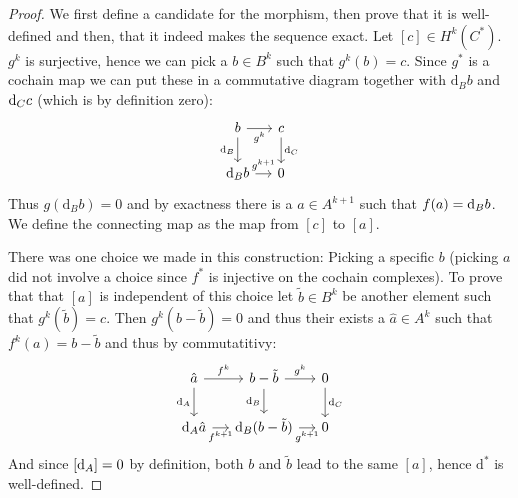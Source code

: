 \begin{proof}
We first define a candidate for the morphism, then prove that it is well-defined and then,
that it indeed makes the sequence exact. Let $[c] \in H^k(C^*)$. $g^k$ is surjective, hence
we can pick a $b \in B^k$ such that $g^k(b) = c$. Since $g^*$ is a cochain map we can put
these in a commutative diagram together with $\mathrm{d}_B b$ and $\mathrm{d}_C c$ (which is by
definition zero):
\[\begin{tikzcd}[column sep=small]
	b & c \\
	{\mathrm{d}_B b} & 0
	\arrow["{g^k}"', from=1-1, to=1-2]
	\arrow["{\mathrm{d}_B}"', from=1-1, to=2-1]
	\arrow["{\mathrm{d}_C}", from=1-2, to=2-2]
	\arrow["{g^{k + 1}}", from=2-1, to=2-2]
\end{tikzcd}\]
Thus $g(\mathrm{d}_B b) = 0$ and by exactness there is a $a \in A^{k + 1}$ such that 
$f(a) = \mathrm{d}_B b$. We define the connecting map as the map from $[c]$ to $[a]$.

There was one choice we made in this construction: Picking a specific $b$ (picking $a$ did not
involve a choice since $f^*$ is injective on the cochain complexes). To prove that that $[a]$
is independent of this choice let $\tilde{b} \in B^k$ be another element such that
$g^k(\tilde{b})=c$. Then $g^k(b - \tilde{b}) = 0$ and thus their exists a $\hat{a} \in A^k$
such that $f^k(a) = b - \tilde{b}$ and thus by commutatitivy:
\[\begin{tikzcd}[column sep=small]
	{\hat{a}} & {b - \tilde{b}} & 0 \\
	{\mathrm{d}_A\hat{a}} & {\mathrm{d}_B(b - \tilde{b})} & 0
	\arrow["{f^k}", from=1-1, to=1-2]
	\arrow["{\mathrm{d}_A}"', from=1-1, to=2-1]
	\arrow["{g^k}", from=1-2, to=1-3]
	\arrow["{\mathrm{d}_B}"', from=1-2, to=2-2]
	\arrow["{\mathrm{d}_C}", from=1-3, to=2-3]
	\arrow["{f^{k + 1}}"', from=2-1, to=2-2]
	\arrow["{g^{k + 1}}"', from=2-2, to=2-3]
\end{tikzcd}\]
And since $[\mathrm{d}_A] = 0$ by definition, both $b$ and $\tilde{b}$ lead to the same $[a]$, hence
$\mathrm{d}^*$ is well-defined.


\end{proof}
